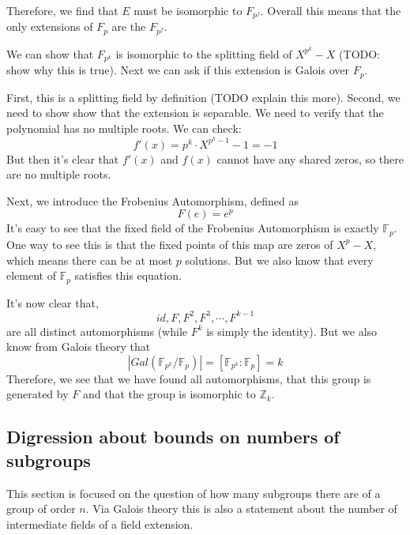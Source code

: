 \documentclass{article}
\begin{document}
Therefore, we find that $ E $ must be isomorphic to $ F_{p^{f}} $. Overall this means that the only extensions of $ F_{p} $ are the $ F_{p^{f}} $.

We can show that $ F_{p^{k}} $ is isomorphic to the splitting field of $ X^{p^{k}} - X $ (TODO: show why this is true). Next we can ask if this extension is Galois over $ F_{p} $.

First, this is a splitting field by definition (TODO explain this more).
Second, we need to show show that the extension is separable. We need to verify that the polynomial has no multiple roots. We can check:
\begin{equation}
f'(x) = p^{k}\cdot X^{p^{k} - 1} - 1 = - 1
\end{equation}
But then it's clear that $f'(x)$ and $f(x)$ cannot have any shared zeros, so there are no multiple roots.

Next, we introduce the Frobenius Automorphism, defined as
\begin{equation}
F(e) = e^{p}
\end{equation}
It's easy to see that the fixed field of the Frobenius Automorphism is exactly $ \mathbb{F}_{p} $. One way to see this is that the fixed points of this map are zeros of $X^{p} - X $, which means there can be at most $ p $ solutions. But we also know that every element of $ \mathbb{F}_{p} $ satisfies this equation.

It's now clear that,
\begin{equation}
id, F, F^{2}, F^{3}, \cdots, F^{k-1}
\end{equation}
are all distinct automorphisms (while $F^{k}$ is simply the identity). But we also know from Galois theory that
\begin{equation}
|Gal(\mathbb{F}_{p^{k}}/\mathbb{F}_{p})| = \left[ \mathbb{F}_{p^{k}} : \mathbb{F}_{p} \right] = k
\end{equation}
Therefore, we see that we have found all automorphisms, that this group is generated by $F$ and that the group is isomorphic to $\mathbb{Z}_{k}$.

\subsection{Digression about bounds on numbers of subgroups}
This section is focused on the question of how many subgroups there are of a group of order $ n $. Via Galois theory this is also a statement about the number of intermediate fields of a field extension.
\end{document}
